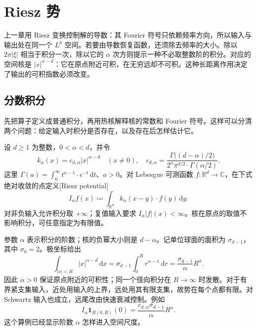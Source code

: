 \section{Riesz 势}
\label{b2:sec:1901}

上一章用 Riesz 变换控制解的导数：其 Fourier 符号只依赖频率方向，所以输入与输出处在同一个 \(L^p\) 空间。若要由导数恢复函数，还须除去频率的大小。除以 \(2\pi|\xi|\) 相当于积分一次，除以它的 \(\alpha\) 次方则提示一种不必取整数阶的积分。对应的空间核是 \(|x|^{\alpha-d}\)：它在原点附近可积，在无穷远却不可积。这种长距离作用决定了输出的可积指数必须改变。

\subsection{分数积分}
\label{b2:subsec:190101}

先把算子定义成普通积分，再用热核解释核的常数和 Fourier 符号。这样可以分清两个问题：给定输入时积分是否存在，以及存在后怎样估计它。
\begin{definition}\label{b2:thm:19-potential-definition}
设 \(d\geq1\) 为整数，\(0<\alpha<d\)，并令
\[
 k_\alpha(x)=c_{d,\alpha}|x|^{\alpha-d}\quad(x\ne0),
 \quad
 c_{d,\alpha}=\frac{\Gamma\bigl((d-\alpha)/2\bigr)}
 {2^\alpha\pi^{d/2}\cdot\Gamma(\alpha/2)}.
\]
这里 \(\Gamma(a)=\int_0^\infty t^{a-1}\cdot e^{-t}\,\mathrm dt\)、\(a>0\)。对 Lebesgue 可测函数 \(f:\mathbb R^d\to\mathbb C\)，在下式绝对收敛的点定义[Riesz potential]
\[
 I_\alpha f(x)\coloneqq\int_{\mathbb R^d}k_\alpha(x-y)\cdot f(y)\,\mathrm dy.
\]
对非负输入允许积分取 \(+\infty\)；复值输入要求 \(I_\alpha|f|(x)<\infty\)。核在原点的取值不影响积分，可任意指定为有限值。
\end{definition}

参数 \(\alpha\) 表示积分的阶数；核的负幂大小则是 \(d-\alpha\)。记单位球面的面积为 \(\sigma_{d-1}\)，其中 \(\sigma_0=2\)。极坐标给出
\[
 \int_{|x|<R}|x|^{\alpha-d}\,\mathrm dx
 =\sigma_{d-1}\int_0^R r^{\alpha-1}\,\mathrm dr
 =\frac{\sigma_{d-1}}\alpha R^\alpha.
\]
因此 \(\alpha>0\) 保证原点附近的可积性；同一个径向积分在 \(R\to\infty\) 时发散。对于有界紧支集输入，近处用输入的上界，远处用其有限支集，故势在每个点都有限。对 Schwartz 输入也成立，远尾改由快速衰减控制。例如
\[
 I_\alpha\mathbf1_{B(0,R)}(0)
 =\frac{c_{d,\alpha}\sigma_{d-1}}\alpha R^\alpha.
\]
这个算例已经显示阶数 \(\alpha\) 怎样进入空间尺度。

\ProseParagraphBreak


